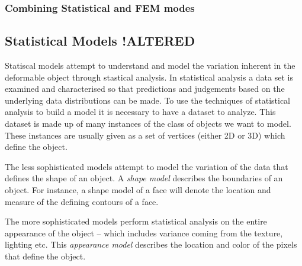 \documentclass[11pt,a4paper]{report}
\begin{document}
\subsubsection{Combining Statistical and FEM modes}

\subsection{Statistical Models !ALTERED}
Statiscal models attempt to understand and model the variation inherent in the
deformable object through stastical analysis. In statistical analysis a data set
is examined and characterised so that predictions and judgements based on the
underlying data distributions can be made. To use the techniques of statistical
analysis to build a model it is necessary to have a dataset to analyze. This
dataset is made up of many instances of the class of objects we want to
model. These instances are usually given as a set of vertices (either 2D or 3D)
which define the object. 

The less sophisticated models attempt to model the variation of the data that defines the shape of an
object. A \textit{shape model} describes the boundaries of an object. For instance, a
shape model of a face will denote the location and measure of the defining
contours of a face.

The more sophisticated models perform statistical analysis on the entire
appearance of the object -- which includes variance coming from the texture, lighting etc. 
This \textit{appearance model} describes the location and color of the pixels
that define the object.
\end{document}
